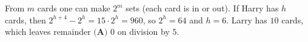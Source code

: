 From $m$ cards one can make $2^m$ sets (each card is in or out). If Harry has $h$ cards, then $2^{h+4}-2^h=15\cdot2^h=960$, so $2^h=64$ and $h=6$. Larry has $10$ cards, which leaves remainder $\boxed{\textbf{(A) }0}$ on division by $5$.
